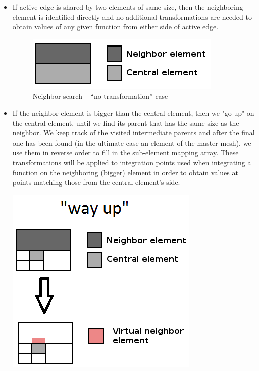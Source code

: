 \begin{itemize}
  \item If active edge is shared by two elements of same size, then the neighboring element is identified directly and 
  no additional transformations are needed to obtain values of any given function from either side of active edge.
\begin{figure}[!ht]
  \centering
  \includegraphics[scale=.45]{no_trans}
  \caption{Neighbor search -- ``no transformation'' case}
\end{figure}
  
  \item If the neighbor element is bigger than the central element, then we "go up" on the central element, until we
  find its parent that has the same size as the neighbor. We keep track of the visited intermediate parents and after 
  the final one has been found (in the ultimate case an element of the master
  mesh), we use them in reverse order to fill in the sub-element mapping array. These
  transformations will be applied to integration points used when integrating a function on the neighboring
  (bigger) element in order to obtain values at points matching those from the central element's side.
  
\begin{minipage}{\linewidth}
    \centering
    \includegraphics[scale=.6]{way_up2}
\end{minipage}
  

\end{itemize}
